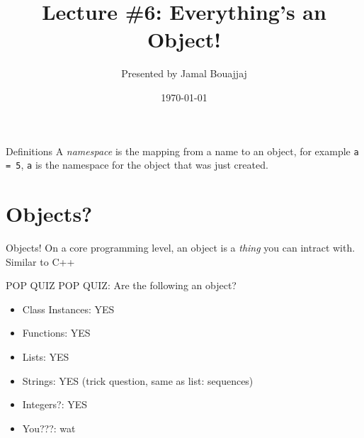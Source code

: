 %
%



\title{Lecture \#6: Everything's an Object!}
\date{\today}
\author{Presented by Jamal Bouajjaj}

\makeatletter
{}%
\makeatother



\maketitle

\begin{frame}[containsverbatim]{Definitions}
  A \textit{namespace} is the mapping from a name to an object, for example \texttt{a = 5}, \verb|a| is the namespace for the object  that was just created.
\end{frame}

\section{Objects?}

\begin{frame}{Objects!}
  On a core programming level, an object is a \textit{thing} you can intract with. Similar to C++
\end{frame}

\begin{frame}{POP QUIZ}
  POP QUIZ: Are the following an object?
  \begin{itemize}
    \item Class Instances: \pause YES \pause
    \item Functions: \pause YES \pause
    \item Lists: \pause YES \pause
    \item Strings: \pause YES (trick question, same as list: sequences) \pause
    \item Integers?: \pause YES \pause
    \item You???: \pause wat
  \end{itemize}
\end{frame}

